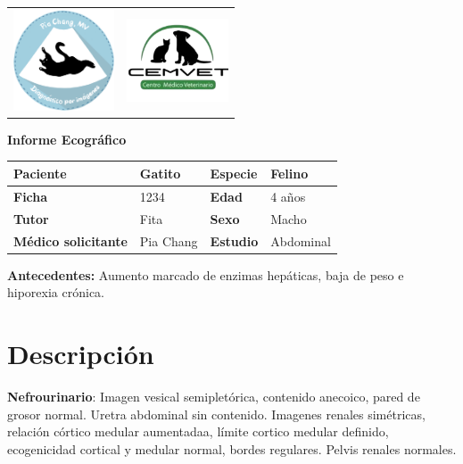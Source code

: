 \documentclass{article}
\begin{document}

\noindent\begin{tabularx}{\textwidth}{XR}
  \includegraphics[width=3cm]{./logo.jpg} & \includegraphics[width=3cm]{./cemvet.jpg} \\
\end{tabularx}


\begin{center}
  {\huge\textbf{Informe Ecográfico}}
\end{center}

\renewcommand{\arraystretch}{1.8}
\noindent\begin{tabularx}{\textwidth}{|XX|XX|}
  \hline
  \textbf{Paciente}           & Gatito  & \textbf{Especie} & Felino \\
  \hline
  \textbf{Ficha}              & 1234  & \textbf{Edad}    & 4 años \\
  \hline
  \textbf{Tutor}              & Fita  & \textbf{Sexo}    & Macho \\
  \hline
  \textbf{Médico solicitante} & Pia Chang  & \textbf{Estudio} & Abdominal \\
  \hline
\end{tabularx}
\renewcommand{\arraystretch}{1}

\textbf{Antecedentes:} Aumento marcado de enzimas hepáticas, baja de peso e hiporexia crónica.


\section*{Descripción}
\textbf{Nefrourinario}: Imagen vesical semipletórica, contenido anecoico, pared de grosor normal. Uretra abdominal sin contenido. Imagenes renales simétricas, relación córtico medular aumentadaa, límite cortico medular definido, ecogenicidad cortical y medular normal, bordes regulares. Pelvis renales normales.
\end{document}
